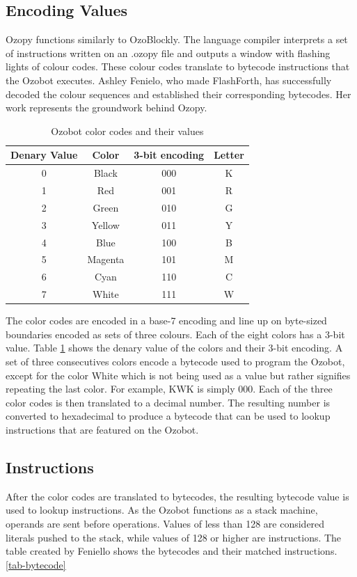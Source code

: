 \documentclass[oneside,%
                    author={Malak Hajji},
                    degree={BSc},
                    title={Designing An Accessible Computational Toolkit For Students},
                  subtitle={With Mixed Visual Abilities}]{dissertation}
\begin{document}
\subsection{Encoding Values}
Ozopy functions similarly to OzoBlockly. The language compiler interprets a set of instructions written on an .ozopy file and outputs a window with flashing lights  of colour codes. These colour codes translate to bytecode instructions that the Ozobot executes. Ashley Fenielo, who made FlashForth, has successfully decoded the colour sequences and established their corresponding bytecodes\cite{ashley}. Her work represents the groundwork behind Ozopy.
\FloatBarrier
\begin{table}[h]
\centering
\begin{tabular}{|c|c|c|c|}
\hline
\textbf{Denary Value}  &\textbf{Color}  & \textbf{3-bit encoding} &  \textbf{Letter}  \\ \hline
0     &Black &000 &K   \\ \hline
1    &Red   &001 &R            \\ \hline
2   &Green &010 &G               \\ \hline
3    &Yellow  & 011 &Y              \\ \hline
4   &Blue &100 &B                \\ \hline
5   &Magenta &101&M             \\ \hline
6   &Cyan & 110 & C                \\ \hline
7   &White & 111 &W               \\ \hline

\hline
\end{tabular}
\caption{Ozobot color codes and their values\cite{ashley}}
\label{tab-colors}
\end{table}
\FloatBarrier
The color codes are encoded in a base-7 encoding and line up on byte-sized boundaries encoded as sets of three colours. Each of the eight colors has a 3-bit value. Table \ref{tab-colors} shows the denary value of the colors and their 3-bit encoding. A set of three consecutives colors encode a bytecode used to program the Ozobot, except for the color White which is not being used as a value but rather signifies repeating the last color. For example, KWK is simply 000. Each of the three color codes is then translated to a decimal number. The resulting number is converted to hexadecimal to produce a bytecode that can be used to lookup instructions that are featured on the Ozobot. 

\subsection{Instructions}
After the color codes are translated to bytecodes, the resulting bytecode value is used to lookup instructions. As the Ozobot functions as a stack machine, operands are sent before operations.
Values of less than 128 are considered literals pushed to the stack, while values of 128 or higher are instructions. The table created by Feniello shows the bytecodes and their matched instructions. \ref{tab-bytecode}
\end{document}
